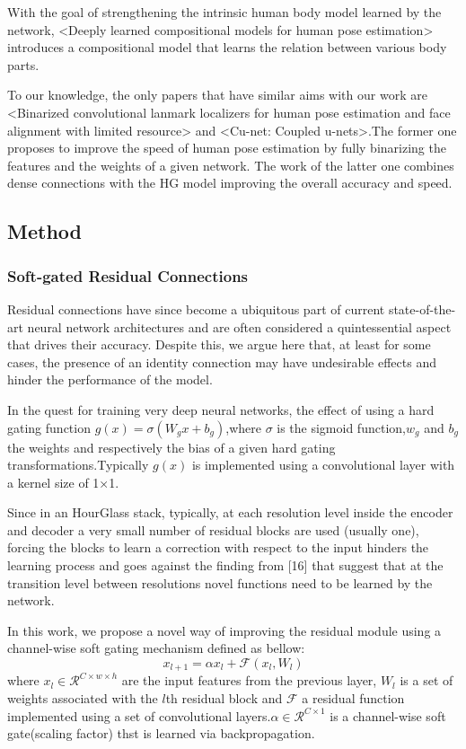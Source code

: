 \documentclass[11pt]{article}
\begin{document}
With the goal of strengthening the intrinsic human body model learned by the network, <Deeply learned compositional models for human pose estimation> introduces a compositional model that learns the relation between various
body parts.

To our knowledge, the only papers that have similar aims with our work are <Binarized convolutional lanmark localizers for human pose estimation and face alignment with limited resource> and <Cu-net: Coupled u-nets>.The former one proposes to improve the speed of human pose estimation by fully binarizing the features and the weights of a given network. The work of the latter one combines dense connections with the HG model improving the overall accuracy and speed.

\subsection{Method}
\subsubsection{Soft-gated Residual Connections}
Residual connections have since become a ubiquitous part of current state-of-the-art neural network architectures and are often considered a quintessential aspect that drives their accuracy. Despite this, we argue here that, at least for some cases, the presence of an identity connection may have undesirable effects and hinder the performance of the model.

In the quest for training very deep neural networks, the effect of using a hard gating function $g(x)=\sigma(W_gx+b_g)$,where $\sigma$ is the sigmoid function,$w_g$ and $b_g$ the weights and respectively the bias of a given hard gating transformations.Typically
$g(x)$ is implemented using a convolutional layer with a kernel size of 1×1.

Since in an HourGlass stack, typically, at each resolution level inside the encoder
and decoder a very small number of residual blocks are used (usually one), forcing the blocks to learn a correction with respect to the input hinders the learning process and goes against the finding from [16] that suggest that at the transition level between resolutions novel functions need to be learned by the network.

In this work, we propose a novel way of improving the residual module using a channel-wise soft gating mechanism defined as bellow:
$$x_{l+1} = \alpha x_l + \mathcal{F}(x_l,W_l)$$
where $x_l\in \mathcal{R}^{C\times w\times h}$ are the input features from the previous layer, $W_l$ is a set of weights associated with the $l$th residual block and $\mathcal{F}$ a residual function implemented using a set of convolutional layers.$\alpha\in \mathcal{R}^{C\times 1}$ is a channel-wise soft gate(scaling factor) thst is learned via backpropagation.
\end{document}
